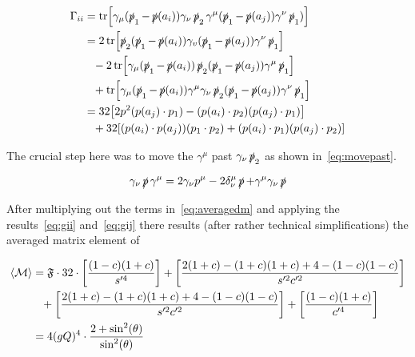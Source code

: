 \begin{equation}
  \label{eq:gij}
  \begin{split}
\Gamma_{ii} &=
\tr[\gamma_\mu(\operatorname{\slashed{p}}_1-\operatorname{\slashed{p}}(a_i))\gamma_\nu\operatorname{\slashed{p}}_2\gamma^\mu(\operatorname{\slashed{p}}_1-\operatorname{\slashed{p}}(a_j))\gamma^\nu\operatorname{\slashed{p}}_1)]\\
&= 2\tr[\operatorname{\slashed{p}}_2(\operatorname{\slashed{p}}_1-\operatorname{\slashed{p}}(a_i))\gamma_v(\operatorname{\slashed{p}}_1-\operatorname{\slashed{p}}(a_j))\gamma^\nu\operatorname{\slashed{p}}_1]\\
&\hphantom{=} - 2\tr[\gamma_\mu(\operatorname{\slashed{p}}_1-\operatorname{\slashed{p}}(a_i))\operatorname{\slashed{p}}_2(\operatorname{\slashed{p}}_1-\operatorname{\slashed{p}}(a_j))\gamma^\mu\operatorname{\slashed{p}}_1]\\
&\hphantom{=} +
\tr[\gamma_\mu(\operatorname{\slashed{p}}_1-\operatorname{\slashed{p}}(a_i))\gamma^\mu\gamma_\nu\operatorname{\slashed{p}}_2(\operatorname{\slashed{p}}_1-\operatorname{\slashed{p}}(a_j))\gamma^\nu\operatorname{\slashed{p}}_1]\\
&= 32 \qty[2p^2(p(a_j)\cdot p_1) - (p(a_i)\cdot p_2)(p(a_j)\cdot p_1)]
   \\
&\hphantom{=} + 32\qty[(p(a_i)\cdot p(a_j))(p_1\cdot p_2) + (p(a_i)\cdot p_1)(p(a_j)\cdot p_2)]
\end{split}
\end{equation}

The crucial step here was to move the \(\gamma^\mu\) past
\(\gamma_\nu\operatorname{\slashed{p}}_2\) as shown in~\eqref{eq:movepast}.

\begin{equation}
  \label{eq:movepast}
  \gamma_\nu\operatorname{\slashed{p}}\gamma^\mu = 2\gamma_\nu p^\mu - 2\delta_\nu^\mu\operatorname{\slashed{p}} +
  \gamma^\mu\gamma_\nu\operatorname{\slashed{p}}
\end{equation}

After multiplying out the terms in~\eqref{eq:averagedm} and applying
the results~\eqref{eq:gii} and~\eqref{eq:gij} there results (after
rather technical simplifications) the
averaged matrix element of

\begin{equation}
  \label{eq:averagedm_final}
  \begin{split}
  \langle\mathcal{M}\rangle &= \mathfrak{F}\cdot
  32\cdot\qty[\frac{(1-c)(1+c)}{s'^4}] + \qty[\frac{2(1+c) -
    (1+c)(1+c)+4-(1-c)(1-c)}{s'^2c'^2}] \\
  &\hphantom{=} +\qty[\frac{2(1+c) -
    (1+c)(1+c)+4-(1-c)(1-c)}{s'^2c'^2}] +
  \qty[\frac{(1-c)(1+c)}{c'^4}] \\
  &= 4(gQ)^4 \cdot\frac{2+\sin^2(\theta)}{\sin^2(\theta)}
  \end{split}
\end{equation}
